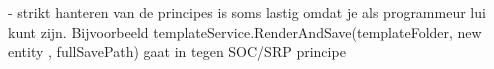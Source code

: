 \chapter{}

- strikt hanteren van de principes is soms lastig omdat je als programmeur lui kunt zijn.
Bijvoorbeeld templateService.RenderAndSave(templateFolder, new { entity }, fullSavePath)
gaat in tegen SOC/SRP principe